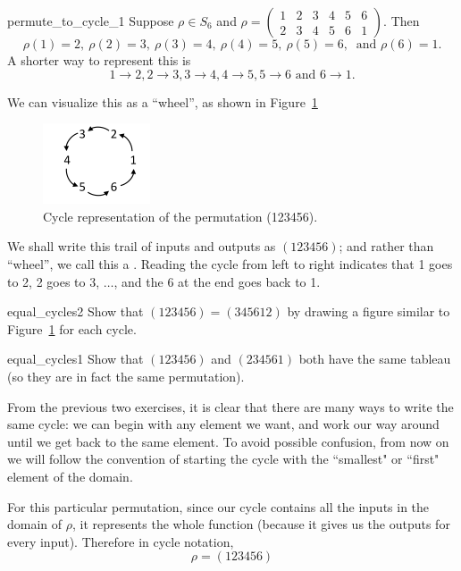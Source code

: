 \begin{example}{permute_to_cycle_1}
Suppose $\rho \in S_6$ and $\rho = \begin{pmatrix} 1 & 2 & 3 & 4 & 5 & 6 \\ 2 & 3 & 4 & 5 & 6 & 1 \end{pmatrix}$.  Then
\[
\rho(1) = 2,\  \rho(2) = 3,\  \rho(3) = 4,\  \rho(4) = 5,\  \rho(5) = 6,\  \text{ and } \rho(6) = 1.
\]
A shorter way to represent this is
\[
1 \to 2, 2 \to 3, 3 \to 4, 4 \to 5, 5 \to 6 \mbox { and } 6 \to 1.
\]

\noindent
We can visualize this as a ``wheel'', as shown in Figure~\ref{fig:cycle}

\begin{figure}[ht]
\begin{center}
\includegraphics[width=1.25in]{images/perm_cycle.png}
\caption{Cycle representation of the  permutation (123456).}\label{fig:cycle}
\end{center}
\end{figure}

We shall write this trail of inputs and outputs as $(123456)$; and rather than ``wheel'', we call this a .  Reading the cycle from left to right indicates that 1 goes to 2, 2 goes to 3, $\ldots$, and the 6 at the end goes back to 1.  %

\begin{exercise}{equal_cycles2}
Show that $(123456) = (345612)$ by drawing a figure similar to Figure~\ref{fig:cycle}  for each cycle.
\end{exercise}

\begin{exercise}{equal_cycles1}
Show that $(123456)$  and $(234561)$ both have the same tableau (so they are in fact the same permutation).
\end{exercise}

From the previous two exercises, it is clear that there are many ways to write the same cycle: we can begin with any element we want, and work our way around until we get back to the same element. To avoid possible confusion, from now on we will follow the convention of starting the cycle with the ``smallest"  or ``first" element of the domain.

For this particular permutation, since our cycle contains all the inputs in the domain of $\rho$, it represents the whole function (because it gives us the outputs for every input).  Therefore in cycle notation, 
\[
\rho = (123456) \]
\end{example}


